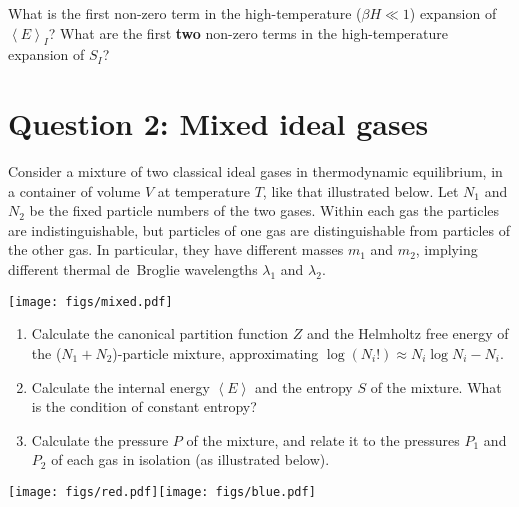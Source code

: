 \documentclass[12 pt]{article} %
\newcommand{\be}{\ensuremath{\beta} }
\newcommand{\la}{\ensuremath{\lambda} }
\newcommand{\vev}[1]{\ensuremath{\left\langle #1 \right\rangle} }
\newcommand{\showmarks}[1]{\rightline{\texttt{[#1 marks]}}} %
\begin{document}
\showmarks{12}

What is the first non-zero term in the high-temperature ($\be H \ll 1$) expansion of $\vev{E}_I$?
What are the first \textbf{two} non-zero terms in the high-temperature expansion of $S_I$?

\showmarks{12}



\newpage
\section*{Question 2: Mixed ideal gases}
Consider a mixture of two classical ideal gases in thermodynamic equilibrium, in a container of volume $V$ at temperature $T$, like that illustrated below.
Let $N_1$ and $N_2$ be the fixed particle numbers of the two gases.
Within each gas the particles are indistinguishable, but particles of one gas are distinguishable from particles of the other gas.
In particular, they have different masses $m_1$ and $m_2$, implying different thermal de~Broglie wavelengths $\la_1$ and $\la_2$.

\begin{center}\texttt{[image: figs/mixed.pdf]}\end{center}

\begin{enumerate}[label={(\alph*)}]
  \item Calculate the canonical partition function $Z$ and the Helmholtz free energy of the ($N_1 + N_2$)-particle mixture, approximating $\log(N_i!) \approx N_i\log N_i - N_i$.

  \showmarks{6}

  \item Calculate the internal energy $\vev{E}$ and the entropy $S$ of the mixture.
        What is the condition of constant entropy?

  \showmarks{6}

  \item Calculate the pressure $P$ of the mixture, and relate it to the pressures $P_1$ and $P_2$ of each gas in isolation (as illustrated below).

  \showmarks{6}
\end{enumerate}

\begin{center}\texttt{[image: figs/red.pdf]}\hspace{0.3\textwidth}\texttt{[image: figs/blue.pdf]}\end{center}
\end{document}
